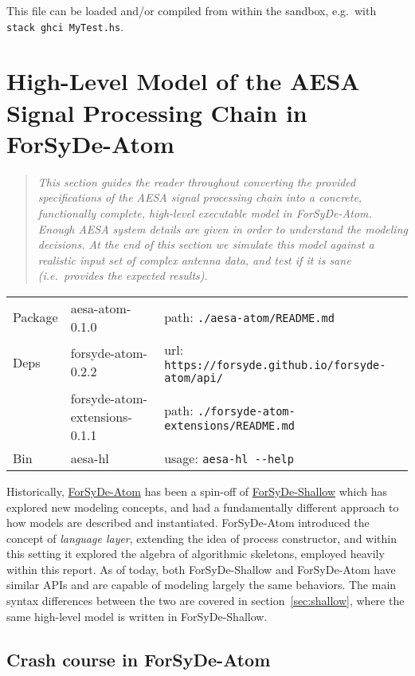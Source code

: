 \documentclass[
  a4paper,
]{article}
\begin{document}
This file can be loaded and/or compiled from within the sandbox,
e.g.~with \texttt{stack\ ghci\ MyTest.hs}.

\clearpage

\hypertarget{sec:atom}{%
\section{High-Level Model of the AESA Signal Processing Chain in
ForSyDe-Atom}\label{sec:atom}}

\begin{quote}
\emph{This section guides the reader throughout converting the provided
specifications of the AESA signal processing chain into a concrete,
functionally complete, high-level executable model in ForSyDe-Atom.
Enough AESA system details are given in order to understand the modeling
decisions. At the end of this section we simulate this model against a
realistic input set of complex antenna data, and test if it is sane
(i.e.~provides the expected results).}
\end{quote}

\begin{longtable}[]{@{}lll@{}}
\toprule
\endhead
Package & aesa-atom-0.1.0 & path:
\texttt{./aesa-atom/README.md}\tabularnewline
Deps & forsyde-atom-0.2.2 & url:
\texttt{https://forsyde.github.io/forsyde-atom/api/}\tabularnewline
& forsyde-atom-extensions-0.1.1 & path:
\texttt{./forsyde-atom-extensions/README.md}\tabularnewline
Bin & aesa-hl & usage: \texttt{aesa-hl\ -\/-help}\tabularnewline
\bottomrule
\end{longtable}

Historically,
\href{https://forsyde.github.io/forsyde-atom/}{ForSyDe-Atom} has been a
spin-off of
\href{https://forsyde.github.io/forsyde-shallow/}{ForSyDe-Shallow} which
has explored new modeling concepts, and had a fundamentally different
approach to how models are described and instantiated. ForSyDe-Atom
introduced the concept of \emph{language layer}, extending the idea of
process constructor, and within this setting it explored the algebra of
algorithmic skeletons, employed heavily within this report. As of today,
both ForSyDe-Shallow and ForSyDe-Atom have similar APIs and are capable
of modeling largely the same behaviors. The main syntax differences
between the two are covered in section~\ref{sec:shallow}, where the same
high-level model is written in ForSyDe-Shallow.

\hypertarget{sec:crash-atom}{%
\subsection{Crash course in ForSyDe-Atom}\label{sec:crash-atom}}
\end{document}
